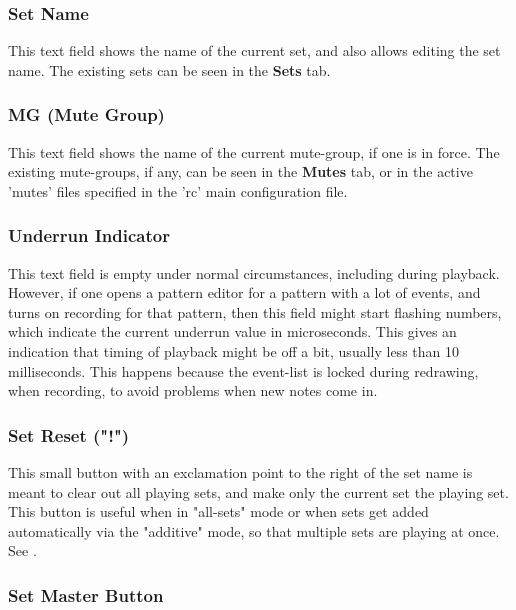\subsubsection{Set Name}
\label{subsubsec:introduction_mg}

   This text field shows the name of the current set, and also allows editing
   the set name.
   The existing sets can be seen in the \textbf{Sets} tab.

\subsubsection{MG (Mute Group)}
\label{subsubsec:introduction_mute_group}

   This text field shows the name of the current mute-group, if one is
   in force. The existing mute-groups, if any, can be seen in the
   \textbf{Mutes} tab, or in the active 'mutes' files specified in the
   'rc' main configuration file.

\subsubsection{Underrun Indicator}
\label{subsubsec:introduction_underrun_indicator}

   This text field is empty under normal circumstances, including during
   playback.  However, if one opens a pattern editor for a pattern with a lot
   of events, and turns on recording for that pattern, then this field might
   start flashing numbers, which indicate the
   current underrun value in microseconds.  This gives an indication that
   timing of playback might be off a bit, usually less than 10 milliseconds.
   This happens because the event-list is locked during redrawing,
   when recording, to avoid problems when new notes come in.

\subsubsection{Set Reset ("!")}
\label{subsubsec:introduction_set_reset}

   This small button with an exclamation point
   to the right of the set name is meant to clear
   out all playing sets, and make only the current set the playing set.
   This button is useful when in "all-sets" mode or when sets get added
   automatically via the "additive" mode, so that multiple sets are playing
   at once.
   See .

\subsubsection{Set Master Button}
\label{subsubsec:introduction_set_master_button}

